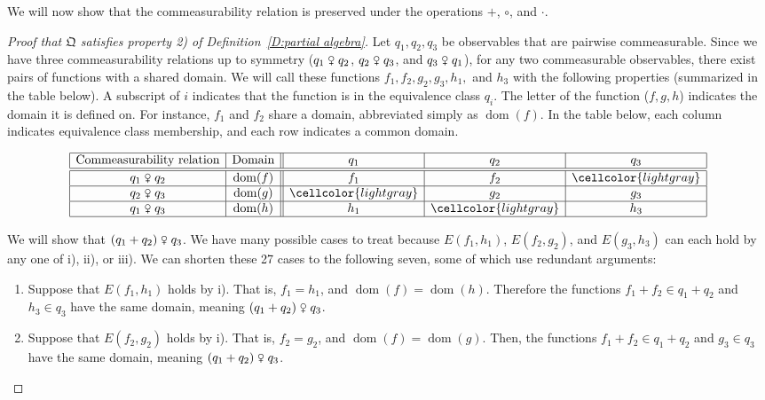 \documentclass{scrartcl}
\DeclareMathOperator{\dom}{dom}
\newcommand{\com}{\mathrel{\venus}}
\begin{document}
We will now show that the commeasurability relation is preserved under the operations $+$, $\circ$, and $\cdot$.

\begin{proof}[Proof that $\mathfrak{Q}$ satisfies property 2) of Definition~\ref{D:partial algebra}] Let $q_1,q_2,q_3$ be observables that are pairwise commeasurable. Since we have three commeasurability relations up to symmetry ($q_1\com q_2$, $q_2\com q_3$, and $q_3\com q_1$), for any two commeasurable observables, there exist pairs of functions with a shared domain. We will call these functions $f_1,f_2,g_2,g_3,h_1,$ and $h_3$ with the following properties (summarized in the table below). A subscript of $i$ indicates that the function is in the equivalence class $q_i$. The letter of the function ($f,g,h$) indicates the domain it is defined on. For instance, $f_1$ and $f_2$ share a domain, abbreviated simply as $\dom(f)$. In the table below, each column indicates equivalence class membership, and each row indicates a common domain.

\[\begin{array}{|c|c||c|c|c|}
\hline \text{Commeasurability relation} & \text{Domain} & q_1 & q_2 & q_3 \\ \hline\hline
q_1\com q_2 & \dom(f) & f_1 & f_2 & \cellcolor{lightgray} \\ \hline
q_2\com q_3 & \dom(g) & \cellcolor{lightgray} & g_2 & g_3\\ \hline
q_1\com q_3 & \dom(h) & h_1 & \cellcolor{lightgray} & h_3 \\ \hline
\end{array}\]

We will show that $(q_1+q_2)\com q_3$. We have many possible cases to treat because $E(f_1,h_1)$, $E(f_2,g_2)$, and $E(g_3,h_3)$ can each hold by any one of i), ii), or iii). We can shorten these 27 cases to the following seven, some of which use redundant arguments:

\begin{enumerate}
\item Suppose that $E(f_1,h_1)$ holds by i). That is, $f_1=h_1$, and $\dom(f)=\dom(h)$. Therefore the functions $f_1+f_2\in q_1+q_2$ and $h_3\in q_3$ have the same domain, meaning $(q_1+q_2)\com q_3$.

\item Suppose that $E(f_2,g_2)$ holds by i). That is, $f_2=g_2$, and $\dom(f)=\dom(g)$. Then, the functions $f_1+f_2\in q_1+q_2$ and $g_3\in q_3$ have the same domain, meaning $(q_1+q_2)\com q_3$.


\end{enumerate}
\end{proof}
\end{document}
